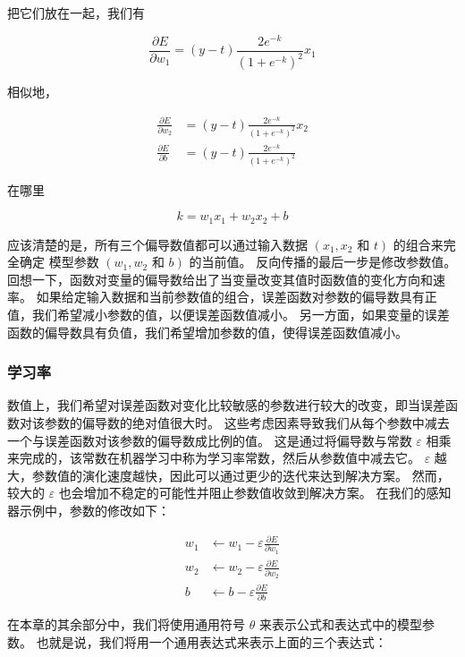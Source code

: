 把它们放在一起，我们有

$$
\frac{\partial E}{\partial w_{1}}=(y-t) \frac{2 e^{-k}}{\left(1+e^{-k}\right)^{2}} x_{1}
$$

相似地，

$$
\begin{aligned}
\frac{\partial E}{\partial w_{2}} & =(y-t) \frac{2 e^{-k}}{\left(1+e^{-k}\right)^{2} } x_{2} \\
\frac{\partial E}{\partial b} & =(y-t) \frac{2 e^{-k}}{\left(1+e^{-k}\right)^{2}}
\end{aligned}
$$

在哪里

$$
k=w_{1} x_{1}+w_{2} x_{2}+b
$$

应该清楚的是，所有三个偏导数值都可以通过输入数据 $\left(x_{1}, x_{2}\right.$ 和 $\left.t\right)$ 的组合来完全确定 模型参数 $\left(w_{1}, w_{2}\right.$ 和 $\left.b\right)$ 的当前值。 反向传播的最后一步是修改参数值。 回想一下，函数对变量的偏导数给出了当变量改变其值时函数值的变化方向和速率。 如果给定输入数据和当前参数值的组合，误差函数对参数的偏导数具有正值，我们希望减小参数的值，以便误差函数值减小。 另一方面，如果变量的误差函数的偏导数具有负值，我们希望增加参数的值，使得误差函数值减小。

\subsubsection{学习率}
数值上，我们希望对误差函数对变化比较敏感的参数进行较大的改变，即当误差函数对该参数的偏导数的绝对值很大时。 这些考虑因素导致我们从每个参数中减去一个与误差函数对该参数的偏导数成比例的值。 这是通过将偏导数与常数 $\varepsilon$ 相乘来完成的，该常数在机器学习中称为学习率常数，然后从参数值中减去它。 $\varepsilon$ 越大，参数值的演化速度越快，因此可以通过更少的迭代来达到解决方案。 然而，较大的 $\varepsilon$ 也会增加不稳定的可能性并阻止参数值收敛到解决方案。 在我们的感知器示例中，参数的修改如下：

$$
\begin{aligned}
w_{1} & \leftarrow w_{1}-\varepsilon \frac{\partial E}{\partial w_{1}} \\
w_{2} & \leftarrow w_{2}-\varepsilon \frac{\partial E}{\partial w_{2}} \\
b & \leftarrow b-\varepsilon \frac{\partial E}{\partial b}
\end{aligned}
$$

在本章的其余部分中，我们将使用通用符号 $\theta$ 来表示公式和表达式中的模型参数。 也就是说，我们将用一个通用表达式来表示上面的三个表达式：

